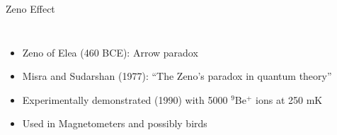 \documentclass[
]{beamer}
\begin{document}
\begin{frame}{Zeno Effect}
	\begin{columns}
		\begin{itemize}
			\item<1-> Zeno of Elea (460 BCE): Arrow paradox
			\item<1-> Misra and Sudarshan (1977): “The Zeno's paradox in quantum theory”
			\item<2-> Experimentally demonstrated (1990) with 5000 $^9$Be$^+$ ions at 250 mK
			\item<3-> Used in Magnetometers and possibly birds
		\end{itemize}

		\centering
	\end{columns}
\end{frame}
\end{document}
